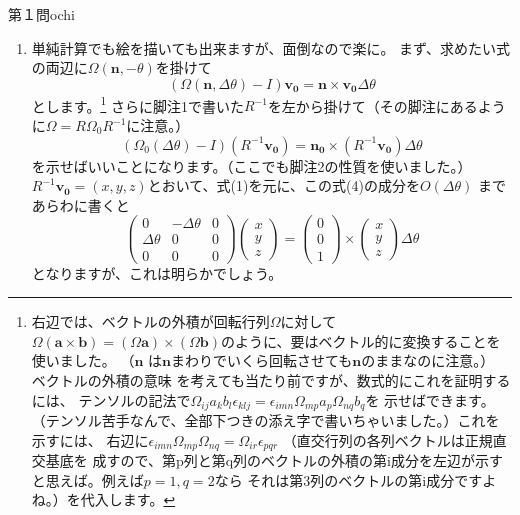 \begin{answer}{第１問}{ochi}
\begin{enumerate}
\item
  単純計算でも絵を描いても出来ますが、面倒なので楽に。
  まず、求めたい式の両辺に$\Omega(\mathbf{n},-\theta)$を掛けて
  \begin{equation}
    (\Omega(\mathbf{n}, \Delta \theta) -I)\mathbf{v_0}=
    \mathbf{n}\times \mathbf{v_0} \Delta \theta
  \end{equation}
  とします。\footnote{右辺では、ベクトルの外積が回転行列$\Omega$に対して$\Omega
  (\mathbf{a}\times\mathbf{b})
  =(\Omega\mathbf{a})\times(\Omega\mathbf{b})$のように、要はベクトル的に変換することを使いました。
  （$\mathbf{n}$
  は$\mathbf{n}$まわりでいくら回転させても$\mathbf{n}$のままなのに注意。）
  ベクトルの外積の意味
  を考えても当たり前ですが、数式的にこれを証明するには、
  テンソルの記法で$\Omega_{ij}a_kb_l\epsilon_{klj}=\epsilon_{imn}\Omega_{mp}a_p\Omega_{nq}b_q$を
  示せばできます。（テンソル苦手なんで、全部下つきの添え字で書いちゃいました。）これを示すには、
  右辺に$\epsilon_{imn}\Omega_{mp}\Omega_{nq}=\Omega_{ir}\epsilon_{pqr}$
  （直交行列の各列ベクトルは正規直交基底を
  成すので、第p列と第q列のベクトルの外積の第i成分を左辺が示すと思えば。例えば$p=1,q=2$なら
  それは第3列のベクトルの第i成分ですよね。）を代入します。}
  さらに脚注1で書いた$R^{-1}$を左から掛けて（その脚注にあるように$\Omega=R\Omega_0 R^{-1}$に注意。）
  \begin{equation}
    (\Omega_0(\Delta \theta)-I)(R^{-1}\mathbf{v_0})
    =\mathbf{n_0} \times (R^{-1}\mathbf{v_0}) \Delta \theta
  \end{equation}
  を示せばいいことになります。（ここでも脚注2の性質を使いました。）
  $R^{-1}\mathbf{v_0}=(x,y,z)$とおいて、式(1)を元に、この式(4)の成分を$O(\Delta \theta)$
  まであらわに書くと
  \begin{equation}
    \begin{pmatrix}
      0 & -\Delta \theta & 0\\
      \Delta \theta & 0 & 0\\
      0 & 0 & 0
    \end{pmatrix}
    \begin{pmatrix}
      x\\
      y\\
      z
    \end{pmatrix}=
    \begin{pmatrix}
      0\\
      0\\
      1
    \end{pmatrix}\times
    \begin{pmatrix}
      x\\
      y\\
      z
    \end{pmatrix}
    \Delta \theta
  \end{equation}
  となりますが、これは明らかでしょう。\\


\end{enumerate}
\end{answer}

